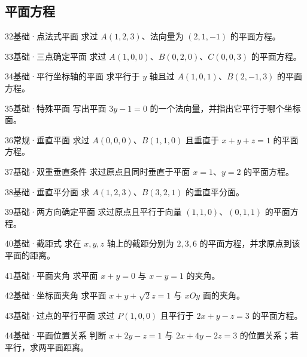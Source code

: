 \subsection{平面方程}
\begin{exercise}{32}{基础·点法式平面}
求过 $A(1,2,3)$、法向量为 $(2,1,-1)$ 的平面方程。
\end{exercise}
\begin{exercise}{33}{基础·三点确定平面}
求过 $A(1,0,0)$、$B(0,2,0)$、$C(0,0,3)$ 的平面方程。
\end{exercise}
\begin{exercise}{34}{基础·平行坐标轴的平面}
求平行于 $y$ 轴且过 $A(1,0,1)$、$B(2,-1,3)$ 的平面方程。
\end{exercise}
\begin{exercise}{35}{基础·特殊平面}
写出平面 $3y-1=0$ 的一个法向量，并指出它平行于哪个坐标面。
\end{exercise}
\begin{exercise}{36}{常规·垂直平面}
求过 $A(0,0,0)$、$B(1,1,0)$ 且垂直于 $x+y+z=1$ 的平面方程。
\end{exercise}
\begin{exercise}{37}{基础·双重垂直条件}
求过原点且同时垂直于平面 $x=1$、$y=2$ 的平面方程。
\end{exercise}
\begin{exercise}{38}{基础·垂直平分面}
求 $A(1,2,3)$、$B(3,2,1)$ 的垂直平分面。
\end{exercise}
\begin{exercise}{39}{基础·两方向确定平面}
求过原点且平行于向量 $(1,1,0)$、$(0,1,1)$ 的平面方程。
\end{exercise}
\begin{exercise}{40}{基础·截距式}
求在 $x,y,z$ 轴上的截距分别为 $2,3,6$ 的平面方程，并求原点到该平面的距离。
\end{exercise}
\begin{exercise}{41}{基础·平面夹角}
求平面 $x+y=0$ 与 $x-y=1$ 的夹角。
\end{exercise}
\begin{exercise}{42}{基础·坐标面夹角}
求平面 $x+y+\sqrt2z=1$ 与 $xOy$ 面的夹角。
\end{exercise}
\begin{exercise}{43}{基础·过点的平行平面}
求过 $P(1,0,0)$ 且平行于 $2x+y-z=3$ 的平面方程。
\end{exercise}
\begin{exercise}{44}{基础·平面位置关系}
判断 $x+2y-z=1$ 与 $2x+4y-2z=3$ 的位置关系；若平行，求两平面距离。
\end{exercise}
